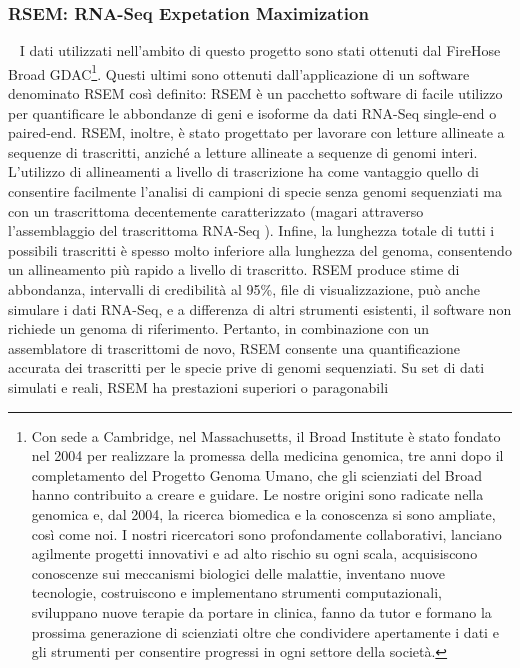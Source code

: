 \subsubsection{RSEM: RNA-Seq Expetation Maximization}~\newline
I dati utilizzati nell'ambito di questo progetto sono stati ottenuti dal FireHose Broad GDAC\footnote{Con sede a
Cambridge, nel Massachusetts, il Broad Institute è stato fondato nel 2004 per realizzare la promessa della medicina
genomica, tre anni dopo il completamento del Progetto Genoma Umano, che gli scienziati del Broad hanno contribuito a
creare e guidare. Le nostre origini sono radicate nella genomica e, dal 2004, la ricerca biomedica e la conoscenza si
sono ampliate, così come noi. I nostri ricercatori sono profondamente collaborativi, lanciano agilmente progetti
innovativi e ad alto rischio su ogni scala, acquisiscono conoscenze sui meccanismi biologici delle malattie, inventano
nuove tecnologie, costruiscono e implementano strumenti computazionali, sviluppano nuove terapie da portare in clinica,
fanno da tutor e formano la prossima generazione di scienziati oltre che condividere apertamente i dati e gli
strumenti per consentire progressi in ogni settore della società.}.
Questi ultimi sono ottenuti dall'applicazione di un software denominato RSEM \cite{li2011rsem} così definito: 
RSEM è un pacchetto software di facile utilizzo per quantificare le abbondanze di geni e isoforme da dati RNA-Seq 
single-end o paired-end. RSEM, inoltre, è stato progettato per lavorare con letture allineate a sequenze di trascritti,
anziché a letture allineate a sequenze di genomi interi. 
L'utilizzo di allineamenti a livello di trascrizione ha come vantaggio quello di consentire facilmente l'analisi di
campioni di specie senza genomi sequenziati ma con un trascrittoma decentemente caratterizzato (magari attraverso
l'assemblaggio del trascrittoma RNA-Seq \cite{robertson2010novo, grabherr2011full}). 
Infine, la lunghezza totale di tutti i possibili trascritti è spesso molto inferiore alla lunghezza del genoma,
consentendo un allineamento più rapido a livello di trascritto.
RSEM produce stime di abbondanza, intervalli di credibilità al 95\%, file di visualizzazione, può anche simulare i dati
RNA-Seq, e a differenza di altri strumenti esistenti, il software non richiede un genoma di riferimento. Pertanto, in
combinazione con un assemblatore di trascrittomi de novo, RSEM consente una quantificazione accurata dei trascritti 
per le specie prive di genomi sequenziati. Su set di dati simulati e reali, RSEM ha prestazioni superiori o paragonabili
